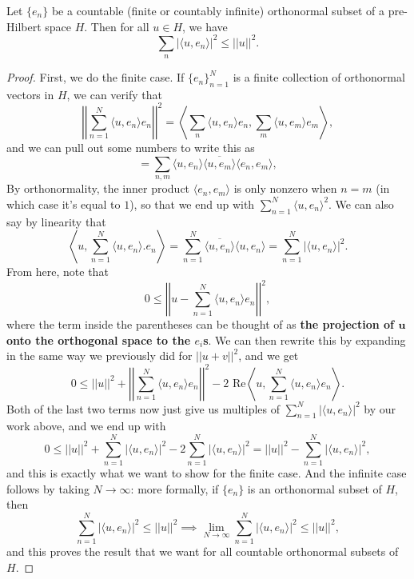 \begin{theorem}[Bessel]
Let $\{e_n\}$ be a countable (finite or countably infinite) orthonormal subset of a pre-Hilbert space $H$. Then for all $u \in H$, we have 
\[
    \sum_n |\langle u, e_n \rangle|^2 \le ||u||^2.
\]
\end{theorem}
\begin{proof}
First, we do the finite case. If $\{e_n\}_{n=1}^N$ is a finite collection of orthonormal vectors in $H$, we can verify that 
\[
    \left|\left|\sum_{n=1}^N \langle u, e_n \rangle e_n \right|\right|^2 = \left\langle \sum_n \langle u, e_n \rangle e_n, \sum_m \langle u, e_m \rangle e_m \right\rangle,
\]
and we can pull out some numbers to write this as 
\[
    = \sum_{n, m} \langle u, e_n \rangle \overline{\langle u, e_m \rangle} \langle e_n, e_m \rangle,
\]
By orthonormality, the inner product $\langle e_n, e_m \rangle$ is only nonzero when $n = m$ (in which case it's equal to $1$), so that we end up with $\sum_{n=1}^{N }\langle u, e_n \rangle^2$. We can also say by linearity that
\[
    \left\langle u, \sum_{n=1}^N \langle u, e_n \rangle.e_n \right\rangle = \sum_{n=1}^N \overline{\langle u, e_n \rangle} \langle u, e_n \rangle = \sum_{n=1}^N |\langle u, e_n \rangle|^2.
\]
From here, note that
\[
    0 \le \left|\left| u - \sum_{n=1}^N \langle u, e_n \rangle e_n \right|\right|^2,
\]
where the term inside the parentheses can be thought of as \textbf{the projection of $\mathbf{u}$ onto the orthogonal space to the $e_i$s}. We can then rewrite this by expanding in the same way we previously did for $||u+v||^2$, and we get
\[
    0 \le ||u||^2 + \left|\left|\sum_{n=1}^N \langle u, e_n \rangle e_n \right|\right|^2 - 2 \,\, \text{Re}\left\langle u, \sum_{n=1}^N \langle u, e_n \rangle e_n\right\rangle.
\]
Both of the last two terms now just give us multiples of $\sum_{n=1}^N |\langle u, e_n \rangle|^2$ by our work above, and we end up with 
\[
    \boxed{0 \le} ||u||^2 + \sum_{n=1}^N |\langle u, e_n \rangle|^2 - 2\sum_{n=1}^N |\langle u, e_n \rangle|^2 = \boxed{||u||^2 - \sum_{n=1}^N |\langle u, e_n \rangle|^2},
\]
and this is exactly what we want to show for the finite case. And the infinite case follows by taking $N \to \infty$: more formally, if $\{e_n\}$ is an orthonormal subset of $H$, then 
\[
    \sum_{n=1}^N |\langle u, e_n \rangle|^2 \le ||u||^2 \implies \lim_{N \to \infty}\sum_{n=1}^N |\langle u, e_n \rangle|^2 \le ||u||^2 ,
\]
and this proves the result that we want for all countable orthonormal subsets of $H$. 
\end{proof}

